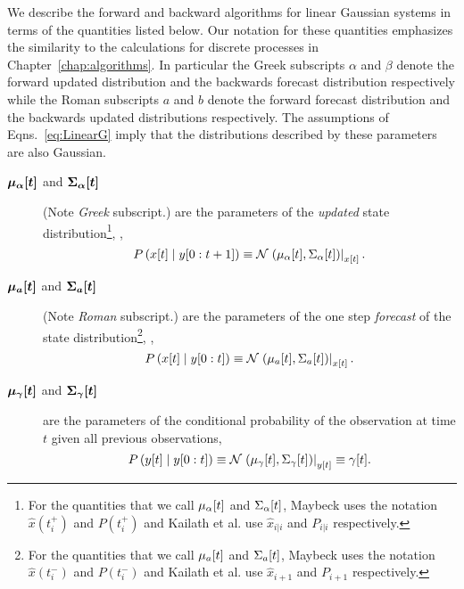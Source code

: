 We describe the forward and backward algorithms for linear Gaussian
systems in terms of the quantities listed below.  Our notation for
these quantities emphasizes the similarity to the calculations for
discrete processes in Chapter~\ref{chap:algorithms}.  In particular
the Greek subscripts $\alpha$ and $\beta$ denote the forward updated
distribution and the backwards forecast distribution respectively while
the Roman subscripts $a$ and $b$ denote the forward forecast
distribution and the backwards updated distributions respectively.
The assumptions of Eqns.~\eqref{eq:LinearG} imply that the
distributions described by these parameters are also Gaussian.
\begin{description}
\item[$\bm{{\mu_\alpha}{[t]}}$ and $\bm{{\Sigma_\alpha}{[t]}}$]
  (Note \emph{Greek} subscript.) are the parameters of the
  \emph{updated} state distribution\footnote{For the quantities that
    we call ${\mu_\alpha}{[t]}$ and ${\Sigma_\alpha}{[t]}$,
    Maybeck\cite{Maybeck82} uses the notation $\hat x(t^+_i)$ and
    $P(t^+_i)$ and Kailath et al.\cite{KSH00} use $\hat x_{i|i}$ and
    $P_{i|i}$ respectively.}, \ie,
  \begin{equation*}
    P\left({x}{[t]}\mid y[0:t+1] \right) \equiv
    {\mathcal{N}}\left.\left({\mu_\alpha}{[t]},{\Sigma_\alpha}{[t]}\right)\right|_{{x}{[t]}}.
  \end{equation*}
\item[$\bm{{\mu_a}{[t]}}$ and $\bm{{\Sigma_a}{[t]}}$] (Note
  \emph{Roman} subscript.) are the parameters of the one step
  \emph{forecast} of the state distribution\footnote{For the
    quantities that we call ${\mu_a}{[t]}$ and ${\Sigma_a}{[t]}$,
    Maybeck\cite{Maybeck82} uses the notation $\hat x(t^-_i)$ and
    $P(t^-_i)$ and Kailath et al.\cite{KSH00} use $\hat x_{i+1}$ and
    $P_{i+1}$ respectively.}, \ie,
  \begin{equation*}
    P \left({x}{[t]}\mid y[0:t] \right) \equiv
    {\mathcal{N}}\left.\left({\mu_a}{[t]},{\Sigma_a}{[t]}\right)\right|_{{x}{[t]}}.
  \end{equation*}
\item[$\bm{{\mu_\gamma}{[t]}}$ and $\bm{{\Sigma_\gamma}{[t]}}$] are
  the parameters of the conditional probability of the observation at
  time $t$ given all previous observations, \ie
  \begin{equation*}
    P\left({y}{[t]}\mid y[0:t] \right) \equiv
    {\mathcal{N}}\left.\left({\mu_\gamma}{[t]},{\Sigma_\gamma}{[t]}\right)\right|_{{y}{[t]}}
    \equiv {\gamma}{[t]}.
  \end{equation*}

\end{description}
